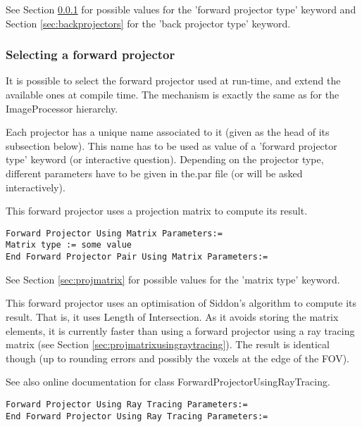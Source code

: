 \documentclass{article}
\begin{document}
See Section \ref{sec:forwardprojectors} for possible values for the 'forward projector 
type' keyword and Section \ref{sec:backprojectors} for the 'back projector type' 
keyword.


\subsubsection{
Selecting a forward projector}
\label{sec:forwardprojectors}
It is possible to select the forward projector used at run-time, 
and extend the available ones at compile time. The mechanism 
is exactly the same as for the ImageProcessor hierarchy.


Each projector has a unique name associated to it (given as the 
head of its subsection below). This name has to be used as value 
of a 'forward projector type' keyword (or interactive question). 
Depending on the projector type, different parameters have to 
be given in the.par file (or will be asked interactively).

{ 
}

This forward projector uses a projection matrix to compute its 
result.

{ 
}
\begin{verbatim}
Forward Projector Using Matrix Parameters:=
Matrix type := some value
End Forward Projector Pair Using Matrix Parameters:=
\end{verbatim}

See Section \ref{sec:projmatrix} for possible values for the 'matrix type' keyword.

{ 
}

This forward projector uses an optimisation of Siddon's algorithm 
to compute its result. That is, it uses Length of Intersection. 
As it avoids storing the matrix elements, it is currently faster 
than using a forward projector using a ray tracing matrix (see 
Section \ref{sec:projmatrixusingraytracing}). The result is identical though (up to rounding 
errors and possibly the voxels at the edge of the FOV).


See also online documentation for class ForwardProjectorUsingRayTracing.

{ 
}
\begin{verbatim}
Forward Projector Using Ray Tracing Parameters:=
End Forward Projector Using Ray Tracing Parameters:=
\end{verbatim}
\end{document}
